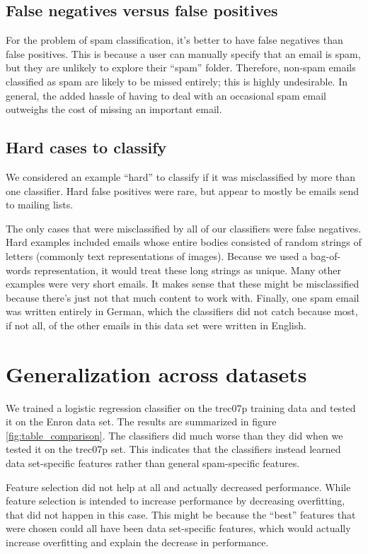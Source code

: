 \documentclass{article} %
\begin{document}
\subsection{False negatives versus false positives}
For the problem of spam classification, it's better to have false negatives than false positives. This is because a user can manually specify that an email is spam, but they are unlikely to explore their ``spam'' folder. Therefore, non-spam emails classified as spam are likely to be missed entirely; this is highly undesirable. In general, the added hassle of having to deal with an occasional spam email outweighs the cost of missing an important email. 

\subsection{Hard cases to classify}
We considered an example ``hard'' to classify if it was misclassified by more than one classifier. Hard false positives were rare, but appear to mostly be emails send to mailing lists.

The only cases that were misclassified by all of our classifiers were false negatives. Hard examples included emails whose entire bodies consisted of random strings of letters (commonly text representations of images). Because we used a bag-of-words representation, it would treat these long strings as unique. Many other examples were very short emails. It makes sense that these might be misclassified because there's just not that much content to work with. Finally, one spam email was written entirely in German, which the classifiers did not catch because most, if not all, of the other emails in this data set were written in English. 

\section{Generalization across datasets}
We trained a logistic regression classifier on the trec07p training data and tested it on the Enron data set. The results are summarized in figure \ref{fig:table_comparison}. The classifiers did much worse than they did when we tested it on the trec07p set. This indicates that the classifiers instead learned data set-specific features rather than general spam-specific features. 

Feature selection did not help at all and actually decreased performance. While feature selection is intended to increase performance by decreasing overfitting, that did not happen in this case. This might be because the ``best'' features that were chosen could all have been data set-specific features, which would actually increase overfitting and explain the decrease in performance. 
\end{document}
